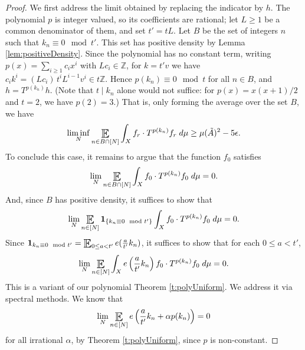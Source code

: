 \begin{proof}
We first address the limit obtained by replacing the indicator by $h$.  
The polynomial $p$ is integer valued, so its coefficients are rational; let $L\geq1$ be a common denominator of them, and set $t'=tL$. 
Let $B$ be the set of integers $n$ 
such that  $k_n\equiv 0 \mod t'$.  
This set has positive density by Lemma \ref{lem:positiveDensity}. 
Since the polynomial has no constant term, writing $p(x)=\sum_{i\geq1}c_ix^i$ with $Lc_i\in\mathbb{Z}$, for $k=t'v$ we have 
$c_ik^i=(Lc_i)\,t^i L^{i-1}v^i\in t\mathbb{Z}$. 
Hence $p(k_n)\equiv 0\mod t$ for all $n\in B$, and   
 $h = T ^{p(k_n)}h$.  
(Note that $t\mid k_n$ alone would not suffice: for $p(x)=x(x+1)/2$ and $t=2$, we have $p(2)=3$.) 
That is, only forming the average over the set $B$, we have 
\begin{align} \label{e:relPrime}
\liminf _{N} \Expectation _{\substack{ n\in B\cap  [N] \\  }} \int_X 
f_r \cdot T ^{p(k_n)} f_r \;d\mu  
\geq   \mu(\tilde A) ^2 - 5\epsilon . 
\end{align}
To conclude this case, it remains to argue that the function $f_0$ satisfies 
\begin{align} 
\lim _{N} \Expectation _{\substack{ n\in B\cap  [N] \\  }} \int_X 
f_0 \cdot T ^{p(k_n)} f_0 \;d\mu  
=0. 
\end{align}
And, since $B$ has positive density, it suffices to show that 
\begin{align} 
\lim _{N} \Expectation _{\substack{ n\in [N] \\  }} 
\mathbf{1}_{\{ k_n\equiv 0 \mod t'\} }
\int_X 
f_0 \cdot T ^{p(k_n)} f_0 \;d\mu  
=0. 
\end{align}
Since $\mathbf{1}_{ k_n\equiv 0 \mod t'}=\Expectation_{0\leq a<t'}e(\frac{a}{t'}k_n)$, 
it suffices to show that for each $0\leq a < t'$, 
\begin{align}  \label{eExpPoy}
\lim _{N} \Expectation _{\substack{ n\in  [N] \\  }} \int_X e\left(\frac{a}{t'}k_n \right) 
f_0 \cdot T ^{p(k_n)} f_0 \;d\mu  
=0.
\end{align}
This is a variant of our  polynomial Theorem \ref{t:polyUniform}.  
We address it via spectral methods.   
We know that 
\begin{align} 
\lim _{N} \Expectation _{\substack{ n\in  [N] \\  }} e\left(\frac{a}{t'} k_n  + \alpha p(k_n) \right) =0
\end{align}
for all irrational $\alpha$, by Theorem \ref{t:polyUniform}, since $p$ is non-constant.  

\end{proof}

